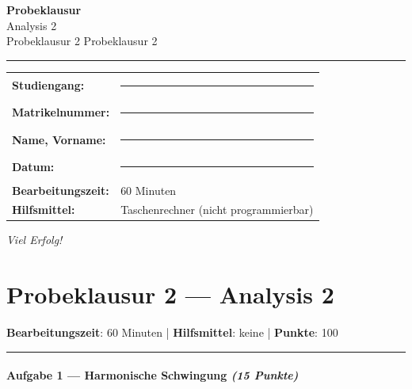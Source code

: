 \documentclass[11pt, a4paper]{article}
\providecommand{\nichttitle}{Probeklausur}
\providecommand{\nichtsubtitle}{}
\renewcommand{\nichttitle}{Analysis 2}
\renewcommand{\nichtsubtitle}{Probeklausur 2}
\begin{document}
\thispagestyle{empty}
\begin{center}
\vspace*{1cm}
{\Huge\bfseries\color{accent}Probeklausur}\\[8pt]
{\Large\color{accent}\nichttitle}\\[4pt]
\ifx\nichtsubtitle\empty\else
  {\large\color{accent!80!black}\nichtsubtitle}\\[6pt]
\fi
\color{accent}\rule{0.5\linewidth}{1pt}\color{black}
\end{center}

\vspace{1cm}
\begin{tabularx}{\textwidth}{@{}l X@{}}
\textbf{Studiengang:}      & \rule{6cm}{0.4pt} \\[6pt]
\textbf{Matrikelnummer:}    & \rule{6cm}{0.4pt} \\[6pt]
\textbf{Name, Vorname:}    & \rule{6cm}{0.4pt} \\[6pt]
\textbf{Datum:}             & \rule{6cm}{0.4pt} \\[6pt]
\textbf{Bearbeitungszeit:}  & 60 Minuten \\[6pt]
\textbf{Hilfsmittel:}       & Taschenrechner (nicht programmierbar) \\
\end{tabularx}

\vspace{2cm}
\begin{center}
{\large\itshape Viel Erfolg!}
\end{center}

\newpage


\section{Probeklausur 2 — Analysis 2}

\textbf{Bearbeitungszeit}: 60 Minuten | \textbf{Hilfsmittel}: keine | \textbf{Punkte}: 100



\noindent\textcolor{rulegray}{\rule{\linewidth}{0.4pt}}


\paragraph{Aufgabe 1 — Harmonische Schwingung \textit{(15 Punkte)}}\mbox{}\\[2pt]
\end{document}
